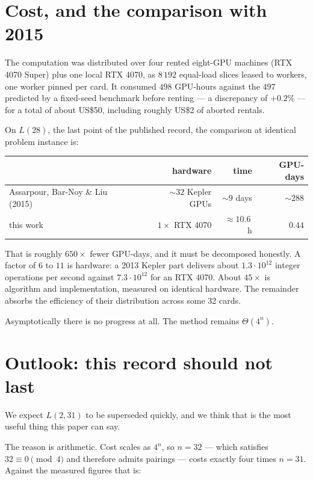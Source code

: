 \documentclass[11pt,a4paper]{article}
\begin{document}
\section{Cost, and the comparison with 2015}
\label{sec:cost}

The computation was distributed over four rented eight-GPU machines
(RTX 4070 Super) plus one local RTX 4070, as $8\,192$ equal-load slices leased
to workers, one worker pinned per card. It consumed $498$ GPU-hours against the
$497$ predicted by a fixed-seed benchmark before renting --- a discrepancy of
$+0.2\%$ --- for a total of about \textsf{US\$50}, including roughly
\textsf{US\$2} of aborted rentals.

On $L(28)$, the last point of the published record, the comparison at identical
problem instance is:

\begin{center}
\begin{tabular}{@{}lrrr@{}}
\toprule
 & hardware & time & GPU-days \\
\midrule
Assarpour, Bar-Noy \& Liu (2015)~\cite{abl} & ${\sim}32$ Kepler GPUs & ${\sim}9$ days & ${\sim}288$ \\
this work & $1 \times$ RTX 4070 & ${\approx}10.6$\,h & $\mathbf{0.44}$ \\
\bottomrule
\end{tabular}
\end{center}

\noindent
That is roughly $650\times$ fewer GPU-days, and it must be decomposed honestly.
A factor of $6$ to $11$ is hardware: a 2013 Kepler part delivers about
$1.3 \cdot 10^{12}$ integer operations per second against $7.3 \cdot 10^{12}$
for an RTX 4070. About $45\times$ is algorithm and implementation, measured on
identical hardware. The remainder absorbs the efficiency of their distribution
across some 32 cards.

Asymptotically there is no progress at all. The method remains $\Theta(4^n)$.

\section{Outlook: this record should not last}
\label{sec:outlook}

We expect $L(2,31)$ to be superseded quickly, and we think that is the most
useful thing this paper can say.

The reason is arithmetic. Cost scales as $4^n$, so $n=32$ --- which satisfies
$32 \equiv 0 \pmod 4$ and therefore admits pairings --- costs exactly four times
$n=31$. Against the measured figures that is:
\end{document}
